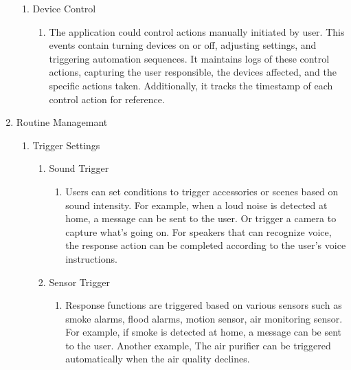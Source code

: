 \begin{enumerate}[label=\arabic*.]
\begin{enumerate}[label=\arabic*.]
        \item {\large{Device Control}}\\
        \begin{enumerate}[label*={\arabic*.},ref=\theenumi.\arabic*]
        \setlength{\itemindent}{0.5cm}
            \item The application could control actions manually initiated by user. This events contain turning devices on or off, adjusting settings, and triggering automation sequences. It maintains logs of these control actions, capturing the user responsible, the devices affected, and the specific actions taken. Additionally, it tracks the timestamp of each control action for reference.\\
        \end{enumerate}
    \end{enumerate}

    \item {\large{Routine Managemant}}\\
    \begin{enumerate}[label*={\arabic*.}]
        \item {\large{Trigger Settings}}\\
            \begin{enumerate}[label*={\alph*.},ref=\theenumi.\arabic*]
            \setlength{\itemindent}{0.5cm}
                \item {\large{Sound Trigger}}\\
                \begin{enumerate}[label*={\arabic*.},ref=\theenumi.\arabic*]
                \setlength{\itemindent}{0.5cm}
                    \item Users can set conditions to trigger accessories or scenes based on sound intensity. For example, when a loud noise is detected at home, a message can be sent to the user. Or trigger a camera to capture what's going on. For speakers that can recognize voice, the response action can be completed according to the user's voice instructions.\\
                \end{enumerate}
                
                \item {\large{Sensor Trigger}}\\
                \begin{enumerate}[label*={\arabic*.},ref=\theenumi.\arabic*]
                \setlength{\itemindent}{0.5cm}
                    \item Response functions are triggered based on various sensors such as smoke alarms, flood alarms, motion sensor, air monitoring sensor. For example, if smoke is detected at home, a message can be sent to the user. Another example, The air purifier can be triggered automatically when the air quality declines.\\
                \end{enumerate}
                

\end{enumerate}
\end{enumerate}
\end{enumerate}
